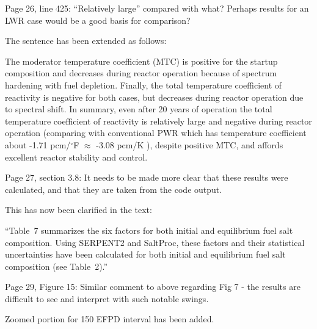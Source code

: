 \documentclass[answers,11pt]{exam}
\begin{document}
\begin{questions}
        \question  Page 26, line 425: ``Relatively large'' compared with what? 
        Perhaps results for an LWR case would be a good basis for comparison?
        \begin{solution}
                The sentence has been extended as follows:
                
                The moderator temperature coefficient (MTC) is positive for the 
                startup composition and decreases during reactor operation 
                because of spectrum hardening with fuel depletion.  Finally, 
                the total temperature coefficient of reactivity is negative for 
                both cases, but decreases during reactor operation due to 
                spectral shift. In summary, even after 20 years of operation 
                the total temperature coefficient of reactivity is relatively 
                large and negative during reactor operation (comparing with 
                conventional PWR which has temperature coefficient about -1.71 
                pcm/$^\circ$F $\approx$ -3.08 pcm/K 
                \cite{forget_integral_2018}), despite positive MTC, and affords 
                excellent reactor stability and control.


        \end{solution}

        \question  Page 27, section 3.8: It needs to be made more clear that 
        these results were calculated, and that they are taken from the code 
        output.
        \begin{solution}
                This has now been clarified in the text:
                
                ``Table~7 summarizes the six factors for both initial and 
                equilibrium fuel salt composition. Using SERPENT2 and SaltProc, 
                these factors and their statistical uncertainties have been 
                calculated for both initial and equilibrium fuel salt 
                composition (see Table~2).''
        \end{solution}

        \question  Page 29, Figure 15: Similar comment to above regarding Fig 7 
        - the results are difficult to see and interpret with such notable 
        swings.
        \begin{solution}
                Zoomed portion for 150 EFPD interval has been added. 
        \end{solution}


\end{questions}
\end{document}
